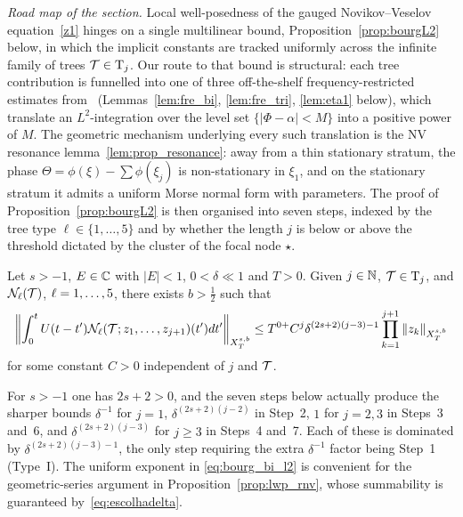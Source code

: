 \noi\textit{Road map of the section.} Local well-posedness of the gauged Novikov--Veselov equation~\eqref{z1} hinges on a single multilinear bound, Proposition~\ref{prop:bourgL2} below, in which the implicit constants are tracked uniformly across the infinite family of trees $\mathcal{T}\in\mathrm{T}_j$. Our route to that bound is structural: each tree contribution is funnelled into one of three off-the-shelf frequency-restricted estimates from~\cite{CLS, COS} (Lemmas~\ref{lem:fre_bi}, \ref{lem:fre_tri}, \ref{lem:eta1} below), which translate an $L^2$-integration over the level set $\{|\Phi-\alpha|<M\}$ into a positive power of $M$. The geometric mechanism underlying every such translation is the NV resonance lemma~\ref{lem:prop_resonance}: away from a thin stationary stratum, the phase $\Theta=\phi(\xi)-\sum\phi(\xi_j)$ is non-stationary in $\xi_1$, and on the stationary stratum it admits a uniform Morse normal form with parameters. The proof of Proposition~\ref{prop:bourgL2} is then organised into seven steps, indexed by the tree type $\ell\in\{1,\dots,5\}$ and by whether the length $j$ is below or above the threshold dictated by the cluster of the focal node $\star$.

\begin{proposition}\label{prop:bourgL2}
Let $s>-1$, $E\in\mathbb{C}$ with $|E|<1$, $0<\delta\ll 1$ and $T>0$. Given $j \in\mathbb{N}$, $\mathcal{T} \in \mathrm{T}_j$, and $\mathcal{N}_\ell(\mathcal{T})$, $\ell=1,\dots,5$, there exists $b>\frac12$ such that
	\begin{align}\label{eq:bourg_bi_l2}
		\left\|\int_0^t U(t-t') \mathcal{N}_\ell(\mathcal{T}; z_1,\dots, z_{j+1})(t') dt'  \right\|_{X^{s,b}_T}  \le T^{0+} C^j\delta^{(2s+2)(j-3)-1}\prod_{k=1}^{j+1}\|z_k\|_{X^{s,b}_T}
	\end{align}
    for some constant $C>0$ independent of $j$ and $\mathcal{T}$.
\end{proposition}

\begin{remark}\label{rmk:exponent_optimal}
For $s>-1$ one has $2s+2>0$, and the seven steps below actually produce the sharper bounds $\delta^{-1}$ for $j=1$, $\delta^{(2s+2)(j-2)}$ in Step~2, $1$ for $j=2,3$ in Steps~3 and~6, and $\delta^{(2s+2)(j-3)}$ for $j\ge 3$ in Steps~4 and~7. Each of these is dominated by $\delta^{(2s+2)(j-3)-1}$, the only step requiring the extra $\delta^{-1}$ factor being Step~1 (Type~I). The uniform exponent in \eqref{eq:bourg_bi_l2} is convenient for the geometric-series argument in Proposition~\ref{prop:lwp_rnv}, whose summability is guaranteed by~\eqref{eq:escolhadelta}.
\end{remark}

